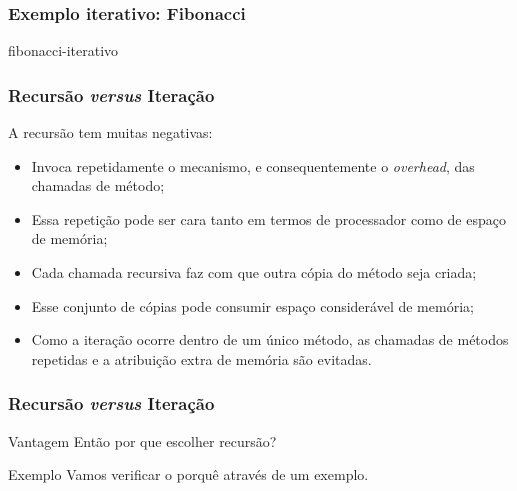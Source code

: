\documentclass[aspectratio=169]{beamer}
\begin{document}

\begin{frame}
\frametitle{Exemplo iterativo: Fibonacci}

\begin{algorithm}[H]
\caption{fibonacci-iterativo} 
\label{fibonacci-iterativo}
\end{algorithm}

\end{frame}

% 


\begin{frame}
\frametitle{Recursão {\it versus} Iteração}
A recursão tem muitas negativas:
  \begin{itemize}
    \item Invoca repetidamente o mecanismo, e consequentemente o {\it overhead}, das chamadas de método;
    \item Essa repetição pode ser cara tanto em termos de processador como de espaço de memória;
    \item Cada chamada recursiva faz com que outra cópia do método seja criada;
    \item Esse conjunto de cópias pode consumir espaço considerável de memória;
    \item Como a iteração ocorre dentro de um único método, as chamadas de métodos repetidas e a atribuição extra de memória são evitadas.
  \end{itemize}
\end{frame}



\begin{frame}
\frametitle{Recursão {\it versus} Iteração}
\begin{block}{Vantagem}
   Então por que escolher recursão?
\end{block}
\pause
\begin{block}{Exemplo}
   Vamos verificar o porquê através de um exemplo.
\end{block}
\end{frame}
\end{document}
